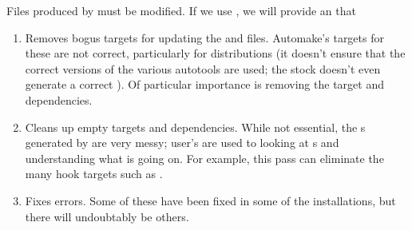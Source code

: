 \documentclass{article}
\begin{document}
Files produced by  must be modified.  If we use
, we will provide an  that 
\begin{enumerate}
\item Removes bogus targets for updating the  and
   files.  Automake's targets for these are not correct,
  particularly for distributions (it doesn't ensure that the correct versions
  of the various autotools are used; the stock  doesn't even
  generate a correct ).  Of particular importance is
  removing the  target and dependencies.
\item Cleans up empty targets and dependencies.  While not essential, the
  s generated by  are very messy; user's are
  used to looking at s and understanding what is going on.  For
  example, this pass can eliminate the many hook targets such as
  .
\item Fixes errors.  Some of these have been fixed in some of the
   installations, but there will undoubtably be others.
\end{enumerate}

\fi

\let\SaveBibliography=\thebibliography
\def\thebibliography#1{\SaveBibliography{#1}\addcontentsline{toc}{section}{References}}



\let\SaveIndex=\theindex
\def\theindex{\SaveIndex\addcontentsline{toc}{section}{Index}}

\end{document}
